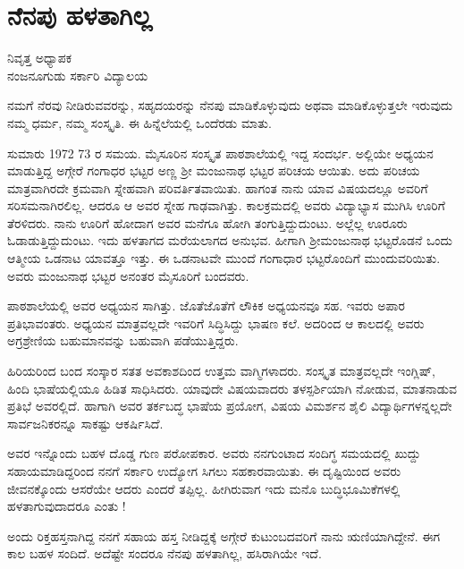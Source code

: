 {\fontsize{14}{16}\selectfont
\chapter{ನೆನಪು ಹಳತಾಗಿಲ್ಲ}

\begin{center}
\smallskip

ನಿವೃತ್ತ ಅಧ್ಯಾಪಕ\\
ನಂಜನೂಗುಡು ಸರ್ಕಾರಿ ವಿದ್ಯಾಲಯ
\addrule
\end{center}

ನಮಗೆ ನೆರವು ನೀಡಿರುವವರನ್ನು, ಸಹೃದಯರನ್ನು ನೆನಪು ಮಾಡಿಕೊಳ್ಳುವುದು ಅಥವಾ ಮಾಡಿಕೊಳ್ಳುತ್ತಲೇ ಇರುವುದು ನಮ್ಮ ಧರ್ಮ, ನಮ್ಮ ಸಂಸ್ಕೃತಿ. ಈ ಹಿನ್ನೆಲೆಯಲ್ಲಿ ಒಂದೆರಡು ಮಾತು.

ಸುಮಾರು 1972   \enginline{-}   73 ರ ಸಮಯ. ಮೈಸೂರಿನ ಸಂಸ್ಕೃತ ಪಾಠಶಾಲೆಯಲ್ಲಿ ಇದ್ದ ಸಂದರ್ಭ. ಅಲ್ಲಿಯೇ ಅಧ್ಯಯನ ಮಾಡುತ್ತಿದ್ದ ಅಗ್ಗೇರೆ ಗಂಗಾಧರ ಭಟ್ಟರ ಅಣ್ಣ ಶ್ರೀ ಮಂಜುನಾಥ ಭಟ್ಟರ ಪರಿಚಯ ಆಯಿತು. ಅದು ಪರಿಚಯ ಮಾತ್ರವಾಗಿರದೇ ಕ್ರಮವಾಗಿ ಸ್ನೇಹವಾಗಿ ಪರಿವರ್ತಿತವಾಯಿತು. ಹಾಗಂತ ನಾನು ಯಾವ ವಿಷಯದಲ್ಲೂ ಅವರಿಗೆ ಸರಿಸಮನಾಗಿರಲಿಲ್ಲ. ಆದರೂ ಆ ಅವರ ಸ್ನೇಹ ಗಾಢವಾಗಿತ್ತು. ಕಾಲಕ್ರಮದಲ್ಲಿ ಅವರು ವಿದ್ಯಾಭ್ಯಾಸ ಮುಗಿಸಿ ಊರಿಗೆ ತೆರಳಿದರು. ನಾನು ಊರಿಗೆ ಹೋದಾಗ ಅವರ ಮನೆಗೂ ಹೋಗಿ ತಂಗುತ್ತಿದ್ದುದುಂಟು. ಅಲ್ಲೆಲ್ಲ ಊರೂರು ಓಡಾಡುತ್ತಿದ್ದುದುಂಟು. ಇದು ಹಳತಾಗದ   \enginline{-}   ಮರೆಯಲಾಗದ ಅನುಭವ. ಹೀಗಾಗಿ ಶ್ರೀಮಂಜುನಾಥ ಭಟ್ಟರೊಡನೆ ಒಂದು ಆತ್ಮೀಯ ಒಡನಾಟ ಯಾವತ್ತೂ ಇತ್ತು. ಈ ಒಡನಾಟವೇ ಮುಂದೆ ಗಂಗಾಧಾರ ಭಟ್ಟರೊಂದಿಗೆ ಮುಂದುವರಿಯಿತು. ಅವರು ಮಂಜುನಾಥ ಭಟ್ಟರ ಅನಂತರ ಮೈಸೂರಿಗೆ ಬಂದವರು.

ಪಾಠಶಾಲೆಯಲ್ಲಿ ಅವರ ಅಧ್ಯಯನ ಸಾಗಿತ್ತು. ಜೊತೆಜೊತೆಗೆ ಲೌಕಿಕ ಅಧ್ಯಯನವೂ ಸಹ. ಇವರು ಅಪಾರ ಪ್ರತಿಭಾವಂತರು. ಅಧ್ಯಯನ ಮಾತ್ರವಲ್ಲದೇ ಇವರಿಗೆ ಸಿದ್ಧಿಸಿದ್ದು ಭಾಷಣ ಕಲೆ. ಅದರಿಂದ ಆ ಕಾಲದಲ್ಲಿ ಅವರು ಅಗ್ರಶ್ರೇಣಿಯ ಬಹುಮಾನವನ್ನು ಬಹುವಾಗಿ ಪಡೆಯುತ್ತಿದ್ದರು. 

ಹಿರಿಯರಿಂದ ಬಂದ ಸಂಸ್ಕಾರ ಸತತ ಅವಕಾಶದಿಂದ ಉತ್ತಮ ವಾಗ್ಮಿಗಳಾದರು. ಸಂಸ್ಕೃತ ಮಾತ್ರವಲ್ಲದೇ ಇಂಗ್ಲಿಷ್, ಹಿಂದಿ ಭಾಷೆಯಲ್ಲಿಯೂ ಹಿಡಿತ ಸಾಧಿಸಿದರು. ಯಾವುದೇ ವಿಷಯವಾದರು ತಳಸ್ಪರ್ಶಿಯಾಗಿ ನೋಡುವ, ಮಾತನಾಡುವ ಪ್ರತಿಭೆ ಅವರಲ್ಲಿದೆ. ಹಾಗಾಗಿ ಅವರ ತರ್ಕಬದ್ಧ ಭಾಷೆಯ ಪ್ರಯೋಗ, ವಿಷಯ ವಿಮರ್ಶನ ಶೈಲಿ ವಿದ್ಯಾರ್ಥಿಗಳನ್ನಲ್ಲದೇ ಸಾರ್ವಜನಿಕರನ್ನೂ ಸಾಕಷ್ಟು ಆಕರ್ಷಿಸಿದೆ. 

ಅವರ ಇನ್ನೊಂದು ಬಹಳ ದೊಡ್ಡ ಗುಣ ಪರೋಪಕಾರ. ಅವರು ನನಗುಂಟಾದ ಸಂದಿಗ್ಧ ಸಮಯದಲ್ಲಿ  ಖುದ್ದು ಸಹಾಯಮಾಡಿದ್ದರಿಂದ ನನಗೆ ಸರ್ಕಾರಿ ಉದ್ಯೋಗ ಸಿಗಲು ಸಹಕಾರವಾಯಿತು. ಈ ದೃಷ್ಟಿಯಿಂದ ಅವರು ಜೀವನಕ್ಕೊಂದು ಆಸರೆಯೇ ಆದರು ಎಂದರೆ ತಪ್ಪಿಲ್ಲ. ಹೀಗಿರುವಾಗ ಇದು ಮನೊ  \enginline{-}  ಬುದ್ಧಿಭೂಮಿಕೆಗಳಲ್ಲಿ ಹಳತಾಗುವುದಾದರೂ ಎಂತು !

ಅಂದು ರಿಕ್ತಹಸ್ತನಾಗಿದ್ದ ನನಗೆ ಸಹಾಯ ಹಸ್ತ ನೀಡಿದ್ದಕ್ಕೆ ಅಗ್ಗೇರೆ ಕುಟುಂಬದವರಿಗೆ ನಾನು ಋಣಿಯಾಗಿದ್ದೇನೆ. ಈಗ ಕಾಲ ಬಹಳ ಸಂದಿದೆ.  ಅದೆಷ್ಟೇ ಸಂದರೂ ನೆನಪು ಹಳತಾಗಿಲ್ಲ, ಹಸಿರಾಗಿಯೇ ಇದೆ.

\articleend
}
